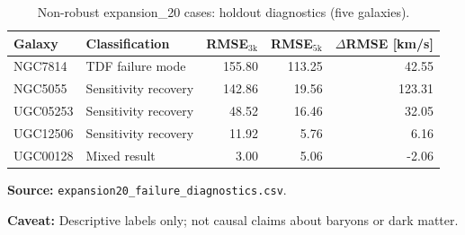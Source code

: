 \begin{table}[htbp]
\centering
\caption{Non-robust expansion\_20 cases: holdout diagnostics (five galaxies).}
\label{tab:nonrobust}
\footnotesize
\begin{tabular}{@{}l l r r r@{}}
\toprule
Galaxy & Classification & RMSE$_{\mathrm{3k}}$ & RMSE$_{\mathrm{5k}}$ & $\Delta$RMSE [km/s] \\
\midrule
NGC7814 & TDF failure mode & 155.80 & 113.25 & 42.55 \\
NGC5055 & Sensitivity recovery & 142.86 & 19.56 & 123.31 \\
UGC05253 & Sensitivity recovery & 48.52 & 16.46 & 32.05 \\
UGC12506 & Sensitivity recovery & 11.92 & 5.76 & 6.16 \\
UGC00128 & Mixed result & 3.00 & 5.06 & -2.06 \\
\bottomrule
\end{tabular}
\vspace{0.4em}
{\footnotesize
\par\noindent\textbf{Source:} \texttt{expansion20\_failure\_diagnostics.csv}.
\par\noindent\textbf{Caveat:} Descriptive labels only; not causal claims about baryons or dark matter.
\par
}
\end{table}
